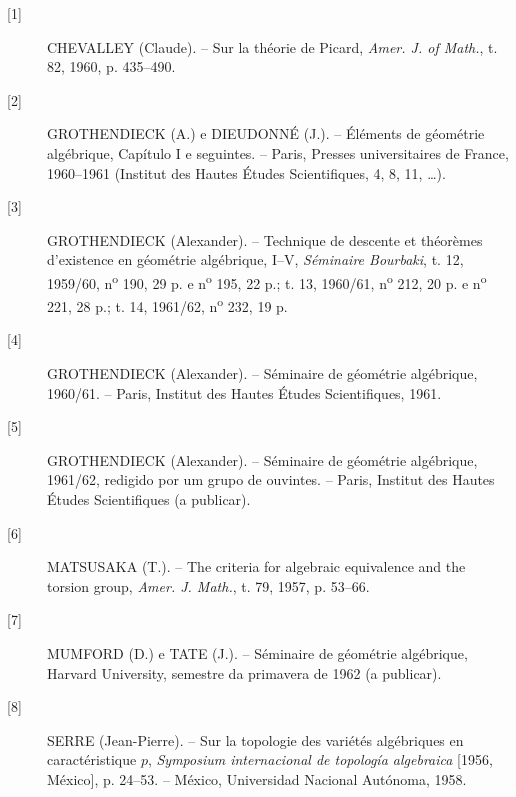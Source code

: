 \begin{description}
\item[{[1]}] CHEVALLEY (Claude). -- Sur la théorie de Picard,
\emph{Amer. J. of Math.}, t. 82, 1960, p. 435--490.

\item[{[2]}] GROTHENDIECK (A.) e DIEUDONNÉ (J.). -- Éléments de géométrie
algébrique, Capítulo I e seguintes. -- Paris, Presses universitaires de France,
1960--1961 (Institut des Hautes Études Scientifiques, 4, 8, 11, \ldots).

\item[{[3]}] GROTHENDIECK (Alexander). -- Technique de descente et théorèmes
d'existence en géométrie algébrique, I--V, \emph{Séminaire Bourbaki}, t. 12,
1959/60, n\textsuperscript{o} 190, 29 p. e n\textsuperscript{o} 195, 22 p.;
t. 13, 1960/61, n\textsuperscript{o} 212, 20 p. e
n\textsuperscript{o} 221, 28 p.; t. 14, 1961/62,
n\textsuperscript{o} 232, 19 p.

\item[{[4]}] GROTHENDIECK (Alexander). -- Séminaire de géométrie algébrique,
1960/61. -- Paris, Institut des Hautes Études Scientifiques, 1961.

\item[{[5]}] GROTHENDIECK (Alexander). -- Séminaire de géométrie algébrique,
1961/62, redigido por um grupo de ouvintes. -- Paris, Institut des Hautes Études
Scientifiques (a publicar).

\item[{[6]}] MATSUSAKA (T.). -- The criteria for algebraic equivalence and the
torsion group, \emph{Amer. J. Math.}, t. 79, 1957, p. 53--66.

\item[{[7]}] MUMFORD (D.) e TATE (J.). -- Séminaire de géométrie algébrique,
Harvard University, semestre da primavera de 1962 (a publicar).

\item[{[8]}] SERRE (Jean-Pierre). -- Sur la topologie des variétés algébriques
en caractéristique $p$, \emph{Symposium internacional de topología algebraica}
[1956, México], p. 24--53. -- México, Universidad Nacional Autónoma, 1958.
\end{description}
